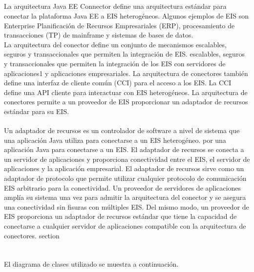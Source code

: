 \documentclass[10pt,a4paper]{article}
\begin{document}
\subsection{\color{colorGENERICO}{Conectores}}
\normalsize{
La arquitectura Java EE Connector define una arquitectura estándar para conectar
la plataforma Java EE a EIS heterogéneos. Algunos ejemplos de EIS son Enterprise
Planificación de Recursos Empresariales (ERP), procesamiento de transacciones (TP) de mainframe y sistemas de bases de datos.
\\
La arquitectura del conector define un conjunto de mecanismos escalables, seguros y transaccionales que permiten la integración de EIS.
escalables, seguros y transaccionales que permiten la integración de los EIS con servidores de aplicaciones1 y aplicaciones empresariales.
La arquitectura de conectores también define una interfaz de cliente común (CCI) para el acceso a los EIS. La CCI define una API cliente para interactuar con EIS heterogéneos.
La arquitectura de conectores permite a un proveedor de EIS proporcionar un adaptador de recursos estándar para su EIS. 
\\
\\
Un adaptador de recursos es un controlador de software a nivel de sistema que una aplicación Java utiliza para conectarse a un EIS heterogéneo.
por una aplicación Java para conectarse a un EIS. El adaptador de recursos se conecta a un
servidor de aplicaciones y proporciona conectividad entre el EIS, el servidor de aplicaciones
y la aplicación empresarial. El adaptador de recursos sirve como un adaptador de protocolo
que permite utilizar cualquier protocolo de comunicación EIS arbitrario para la conectividad.
Un proveedor de servidores de aplicaciones amplía su sistema una vez para admitir la arquitectura del conector
y se asegura una conectividad sin fisuras con múltiples EIS. Del mismo modo,
un proveedor de EIS proporciona un adaptador de recursos estándar que tiene la capacidad de
conectarse a cualquier servidor de aplicaciones compatible con la arquitectura de conectores.
section
}
\section{\color{colorIPN}{Desarrollo}}
\normalsize{
El diagrama de clases utilizado se muestra a continuación.
}
\end{document}
